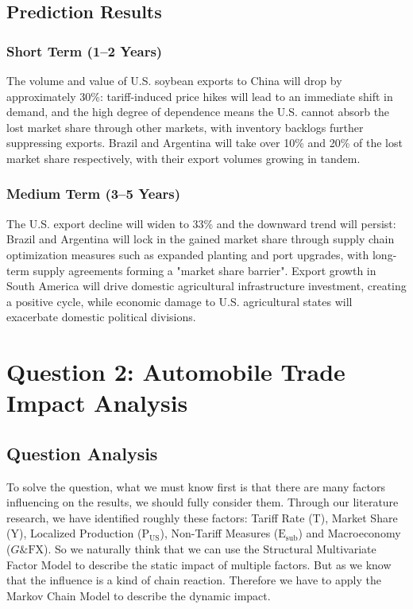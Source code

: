 \documentclass[12pt]{article}
\begin{document}
\subsection{Prediction Results}

\subsubsection{Short Term (1–2 Years)}
The volume and value of U.S. soybean exports to China will drop by approximately 30\%: tariff-induced price hikes will lead to an immediate shift in demand, and the high degree of dependence means the U.S. cannot absorb the lost market share through other markets, with inventory backlogs further suppressing exports. Brazil and Argentina will take over 10\% and 20\% of the lost market share respectively, with their export volumes growing in tandem.

\subsubsection{Medium Term (3–5 Years)}
The U.S. export decline will widen to 33\% and the downward trend will persist: Brazil and Argentina will lock in the gained market share through supply chain optimization measures such as expanded planting and port upgrades, with long-term supply agreements forming a "market share barrier". Export growth in South America will drive domestic agricultural infrastructure investment, creating a positive cycle, while economic damage to U.S. agricultural states will exacerbate domestic political divisions.

\section{Question 2: Automobile Trade Impact Analysis}

\subsection{Question Analysis}
To solve the question, what we must know first is that there are many factors influencing on the results, we should fully consider them. Through our literature research, we have identified roughly these factors: Tariff Rate (T), Market Share (Y), Localized Production ($\text{P}_{\text{US}}$), Non-Tariff Measures ($\text{E}_{\text{sub}}$) and Macroeconomy ($G \& \text{FX}$). So we naturally think that we can use the Structural Multivariate Factor Model to describe the static impact of multiple factors. But as we know that the influence is a kind of chain reaction. Therefore we have to apply the Markov Chain Model to describe the dynamic impact.
\end{document}
